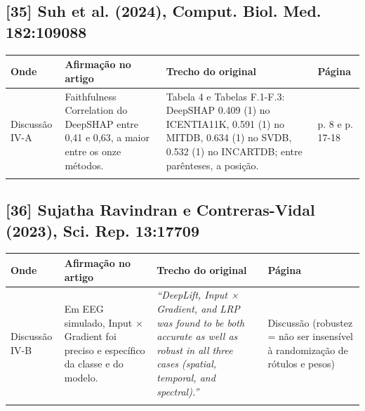 \documentclass[11pt,a4paper]{article}
\begin{document}
\subsection*{[35] Suh et al. (2024), Comput. Biol. Med. 182:109088}
\begin{longtable}{>{\raggedright\arraybackslash}p{2.6cm}>{\raggedright\arraybackslash}p{4.6cm}>{\raggedright\arraybackslash}p{7.6cm}>{\raggedright\arraybackslash}p{1.4cm}}
\toprule
\textbf{Onde} & \textbf{Afirmação no artigo} & \textbf{Trecho do original} & \textbf{Página} \\
\midrule
Discussão IV-A & Faithfulness Correlation do DeepSHAP entre 0,41 e 0,63, a maior entre os onze métodos. & Tabela 4 e Tabelas F.1-F.3: DeepSHAP 0.409 (1) no ICENTIA11K, 0.591 (1) no MITDB, 0.634 (1) no SVDB, 0.532 (1) no INCARTDB; entre parênteses, a posição. & p. 8 e p. 17-18 \\
\addlinespace
\bottomrule
\end{longtable}
\subsection*{[36] Sujatha Ravindran e Contreras-Vidal (2023), Sci. Rep. 13:17709}
\begin{longtable}{>{\raggedright\arraybackslash}p{2.6cm}>{\raggedright\arraybackslash}p{4.6cm}>{\raggedright\arraybackslash}p{7.6cm}>{\raggedright\arraybackslash}p{1.4cm}}
\toprule
\textbf{Onde} & \textbf{Afirmação no artigo} & \textbf{Trecho do original} & \textbf{Página} \\
\midrule
Discussão IV-B & Em EEG simulado, Input × Gradient foi preciso e específico da classe e do modelo. & \textit{``DeepLift, Input × Gradient, and LRP was found to be both accurate as well as robust in all three cases (spatial, temporal, and spectral).''} & Discussão (robustez = não ser insensível à randomização de rótulos e pesos) \\
\addlinespace
\bottomrule
\end{longtable}
\end{document}
